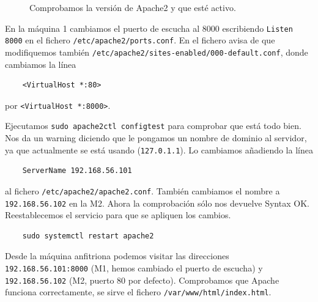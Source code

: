 \documentclass{article}
\begin{document}
\begin{figure}[H]
	\centering
	\caption{Comprobamos la versión de Apache2 y que esté activo.}
	\label{fig:apache2}
\end{figure}

En la máquina 1 cambiamos el puerto de escucha al 8000 escribiendo \texttt{Listen 8000} en el fichero \texttt{/etc/apache2/ports.conf}.
En el fichero avisa de que modifiquemos también \texttt{/etc/apache2/sites-enabled/000-default.conf}, donde cambiamos la línea
\begin{verbatim}
	<VirtualHost *:80>
\end{verbatim}
por \texttt{<VirtualHost *:8000>}.

Ejecutamos \texttt{sudo apache2ctl configtest} para comprobar que está todo bien. Nos da un warning diciendo que le pongamos un
nombre de dominio al servidor, ya que actualmente se está usando (\texttt{127.0.1.1}). Lo cambiamos añadiendo la línea
\begin{verbatim}
	ServerName 192.168.56.101
\end{verbatim}
al fichero \texttt{/etc/apache2/apache2.conf}. También cambiamos el nombre a
\texttt{192.168.56.102} en la M2. Ahora la comprobación sólo nos devuelve Syntax OK.
 Reestablecemos el servicio para que se apliquen los cambios.

\begin{verbatim}
	sudo systemctl restart apache2
\end{verbatim}

Desde la máquina anfitriona podemos visitar las direcciones \texttt{192.168.56.101:8000} (M1, hemos cambiado el puerto de escucha)
 y \texttt{192.168.56.102} (M2, puerto 80 por defecto). Comprobamos que Apache funciona correctamente, se sirve el fichero
 \texttt{/var/www/html/index.html}.
 
\end{document}
